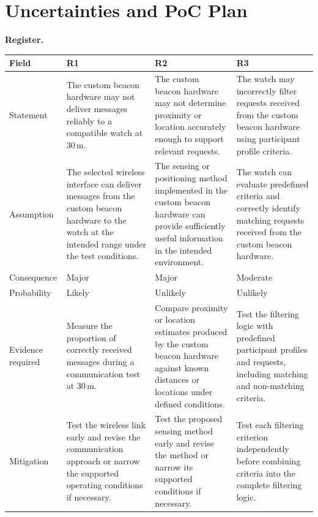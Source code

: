 \documentclass[10pt]{article}
\begin{document}
\section{Uncertainties and PoC Plan}
\textbf{Register.}
\begin{center}
\small
\begin{tabularx}{\linewidth}{@{}l X X X@{}}
\toprule
\textbf{Field} & \textbf{R1} & \textbf{R2} & \textbf{R3}\\
\midrule
Statement &
The custom beacon hardware may not deliver messages reliably to a compatible watch at 30\,m. &
The custom beacon hardware may not determine proximity or location accurately enough to support relevant requests. &
The watch may incorrectly filter requests received from the custom beacon hardware using participant profile criteria.\\

Assumption &
The selected wireless interface can deliver messages from the custom beacon hardware to the watch at the intended range under the test conditions. &
The sensing or positioning method implemented in the custom beacon hardware can provide sufficiently useful information in the intended environment. &
The watch can evaluate predefined criteria and correctly identify matching requests received from the custom beacon hardware.\\

Consequence &
Major &
Major &
Moderate\\

Probability &
Likely &
Unlikely &
Unlikely\\

Evidence required &
Measure the proportion of correctly received messages during a communication test at 30\,m. &
Compare proximity or location estimates produced by the custom beacon hardware against known distances or locations under defined conditions. &
Test the filtering logic with predefined participant profiles and requests, including matching and non-matching criteria.\\

Mitigation &
Test the wireless link early and revise the communication approach or narrow the supported operating conditions if necessary. &
Test the proposed sensing method early and revise the method or narrow its supported conditions if necessary. &
Test each filtering criterion independently before combining criteria into the complete filtering logic.\\
\bottomrule
\end{tabularx}
\end{center}
\end{document}
